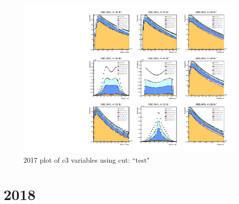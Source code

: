 \documentclass{article}
\begin{document}
                        \begin{figure}[H]
                            \centering
                            \caption{2017 plot of c3 variables using cut: ``test"}
                            \includegraphics[width=\textwidth]{2017/c3_2017_test.pdf}
                        \end{figure}    
    \section*{2018}
\end{document}
